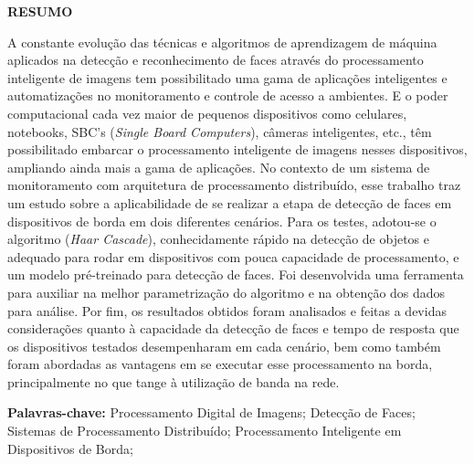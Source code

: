 \begin{center}
    \bfseries\MakeUppercase{Resumo}
\end{center}

A constante evolução das técnicas e algoritmos de aprendizagem de máquina aplicados na detecção e reconhecimento de faces através do processamento inteligente de imagens tem possibilitado uma gama de aplicações inteligentes e automatizações no monitoramento e controle de acesso a ambientes. E o poder computacional cada vez maior de pequenos dispositivos como celulares, notebooks, SBC's (\textit{Single Board Computers}), câmeras inteligentes, etc., têm possibilitado embarcar o processamento inteligente de imagens nesses dispositivos, ampliando ainda mais a gama de aplicações. No contexto de um sistema de monitoramento com arquitetura de processamento distribuído, esse trabalho traz um estudo sobre a aplicabilidade de se realizar a etapa de detecção de faces em dispositivos de borda em dois diferentes cenários. Para os testes, adotou-se o algoritmo (\textit{Haar Cascade}), conhecidamente rápido na detecção de objetos e adequado para rodar em dispositivos com pouca capacidade de processamento, e um modelo pré-treinado para detecção de faces. Foi desenvolvida uma ferramenta para auxiliar na melhor parametrização do algoritmo e na obtenção dos dados para análise. Por fim, os resultados obtidos foram analisados e feitas a devidas considerações quanto à capacidade da detecção de faces e tempo de resposta que os dispositivos testados desempenharam em cada cenário, bem como também foram abordadas as vantagens em se executar esse processamento na borda, principalmente no que tange à utilização de banda na rede. 

\vspace{0.5cm}
 
 \textbf{Palavras-chave:} Processamento Digital de Imagens; Detecção de Faces; Sistemas de Processamento Distribuído; Processamento Inteligente em Dispositivos de Borda;